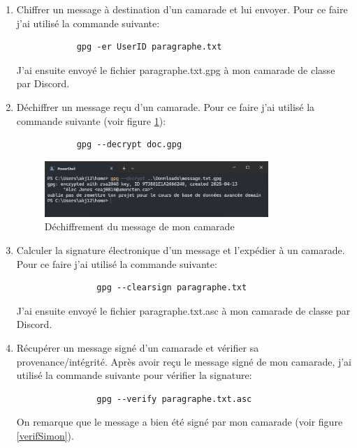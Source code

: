 \documentclass[12pt,a4paper]{article}
\begin{document}
\begin{enumerate}[label=\Roman*]
    \item Chiffrer un message à destination d'un camarade et lui envoyer.
          Pour ce faire j'ai utilisé la commande suivante:
          \begin{verbatim}
            gpg -er UserID paragraphe.txt
          \end{verbatim}
          J'ai ensuite envoyé le fichier paragraphe.txt.gpg à mon camarade de classe par Discord.

    \item Déchiffrer un message reçu d'un camarade.
          Pour ce faire j'ai utilisé la commande suivante (voir figure \ref{dechiffrer}):
          \begin{verbatim}
            gpg --decrypt doc.gpg
            \end{verbatim}

          \begin{figure}[ht]
              \centering
              \includegraphics[width=0.8\textwidth]{../img/dechiffrer.png}
              \caption{Déchiffrement du message de mon camarade}
              \label{dechiffrer}
          \end{figure}

    \item Calculer la signature électronique d'un message et l'expédier à un camarade.
          Pour ce faire j'ai utilisé la commande suivante:
          \begin{verbatim}
                gpg --clearsign paragraphe.txt
            \end{verbatim}
          J'ai ensuite envoyé le fichier paragraphe.txt.asc à mon camarade de classe par Discord.

    \item Récupérer un message signé d'un camarade et vérifier sa provenance/intégrité.
          Après avoir reçu le message signé de mon camarade, j'ai utilisé la commande suivante pour vérifier la signature:
          \begin{verbatim}
                gpg --verify paragraphe.txt.asc
            \end{verbatim}
          On remarque que le message a bien été signé par mon camarade (voir figure \ref{verifSimon}).


\end{enumerate}
\end{document}
